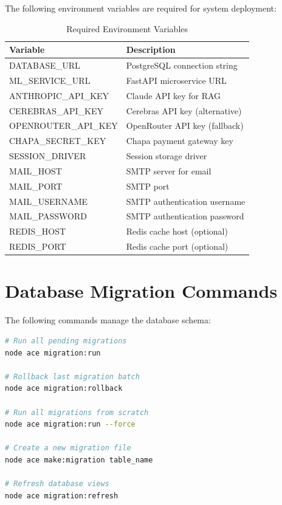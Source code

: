 The following environment variables are required for system deployment:

\begin{longtable}{ll}
\caption{Required Environment Variables}
\label{tab:env-vars} \\
\toprule
\textbf{Variable} & \textbf{Description} \\
\midrule
\endhead
\midrule
\endfoot
\bottomrule
\endlastfoot
DATABASE\_URL & PostgreSQL connection string \\
ML\_SERVICE\_URL & FastAPI microservice URL \\
ANTHROPIC\_API\_KEY & Claude API key for RAG \\
CEREBRAS\_API\_KEY & Cerebras API key (alternative) \\
OPENROUTER\_API\_KEY & OpenRouter API key (fallback) \\
CHAPA\_SECRET\_KEY & Chapa payment gateway key \\
SESSION\_DRIVER & Session storage driver \\
MAIL\_HOST & SMTP server for email \\
MAIL\_PORT & SMTP port \\
MAIL\_USERNAME & SMTP authentication username \\
MAIL\_PASSWORD & SMTP authentication password \\
REDIS\_HOST & Redis cache host (optional) \\
REDIS\_PORT & Redis cache port (optional) \\
\end{longtable}

\section{Database Migration Commands}

The following commands manage the database schema:

\begin{lstlisting}[caption=Database Migration Commands,language=bash]
# Run all pending migrations
node ace migration:run

# Rollback last migration batch
node ace migration:rollback

# Run all migrations from scratch
node ace migration:run --force

# Create a new migration file
node ace make:migration table_name

# Refresh database views
node ace migration:refresh
\end{lstlisting}

